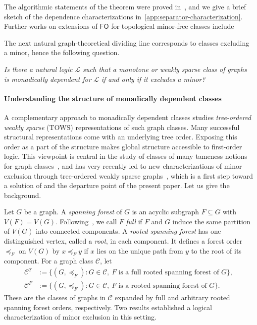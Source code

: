 \documentclass[1p,number,11pt]{elsarticle}
\theoremstyle{plain}
\newcommand{\Cc}{\mathscr{C}}
\renewcommand{\FO}{\ensuremath{\mathsf{FO}}}
\begin{document}
The algorithmic statements of the theorem were proved in~\cite{pillipczuk2021connectivity}, and we give a brief sketch of the dependence characterizations in~\ref{app:separator-characterization}.
Further works on extensions of $\FO$ for topological minor-free classes include~\cite{golovach2022dpminor,SauST25para,schirrmacher2024topodp,bojanczyk2025lowrank,SauSSSTV26}

The next natural graph-theoretical dividing line corresponds to classes excluding a minor, hence the following question.

\begin{problem}
\label{pb:1}
\textsl{Is there a natural logic $\mathcal L$ such that a monotone or weakly sparse class of graphs is monadically dependent for $\mathcal L$ if and only if it excludes a
minor?}
\end{problem}

\paragraph{Understanding the structure of monadically dependent classes}
A complementary approach to monadically dependent classes studies \emph{tree-ordered weakly sparse} (TOWS) representations of such graph classes.
Many successful structural representations come with an underlying tree order. %
Exposing this order as a part of the structure makes global structure accessible to first-order logic.
This viewpoint is central in the study of classes of many tameness notions for graph classes~\cite{bonnet2024twin,bonnet2022twwI,lmcs_perm,covers,mergemodels,Colcombet2007,courcelle1992monadic,dreier2025merge,gajarsky2020first,ganian2019shrub,ganian2012trees},
and has very recently led to new characterizations of minor exclusion through tree-ordered weakly sparse graphs~\cite{buffiere2026characterizations}, which is a first step toward a solution of  and the departure point of the present paper. Let us give the background.
\medskip

Let $G$ be a graph. A \emph{spanning forest} of $G$ is an acyclic subgraph $F\subseteq G$ with $V(F)=V(G)$. 
Following~\cite{gross2018graph}, we call $F$ \emph{full} if $F$ and $G$ induce the same partition of $V(G)$ into connected components. 
A \emph{rooted spanning forest} has one distinguished vertex, called a \emph{root}, in each component. 
It defines a forest order $\preceq_F$ on $V(G)$ by $x\preceq_F y$ if $x$ lies on the unique path from $y$ to the root of its component. 
For a graph class $\Cc$, let
\[
\begin{aligned}
\Cc^\Upsilon&:=\{(G,\preceq_F):G\in\Cc,\ F\text{ is a full rooted spanning forest of }G\},\\
\Cc^F&:=\{(G,\preceq_F):G\in\Cc,\ F\text{ is a rooted spanning forest of }G\}.
\end{aligned}
\]
These are the classes of graphs in $\Cc$ expanded by full and arbitrary rooted spanning forest orders, respectively.
Two results established a logical characterization of minor exclusion in this setting.
\end{document}
